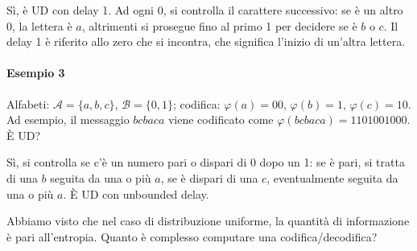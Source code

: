 Sì, è UD con delay 1. Ad ogni 0, si controlla il carattere successivo: se è un altro 0, la lettera è $a$, altrimenti si prosegue fino al primo 1 per decidere se è $b$ o $c$. Il delay 1 è riferito allo zero che si incontra, che significa l'inizio di un'altra lettera.

\paragraph{Esempio 3} Alfabeti: $\mathcal{A}=\{a,b,c\}$, $\mathcal{B}=\{0,1\}$; codifica: $\varphi(a)=00$, $\varphi(b)=1$, $\varphi(c)=10$. Ad esempio, il messaggio $bcbaca$ viene codificato come $\varphi(bcbaca)=1101001000$. È UD? 

Sì, si controlla se c'è un numero pari o dispari di 0 dopo un 1: se è pari, si tratta di una $b$ seguita da una o più $a$, se è dispari di una $c$, eventualmente seguita da una o più $a$. È UD con unbounded delay.\bigskip 

Abbiamo visto che nel caso di distribuzione uniforme, la quantità di informazione è pari all'entropia. Quanto è complesso computare una codifica/decodifica?

